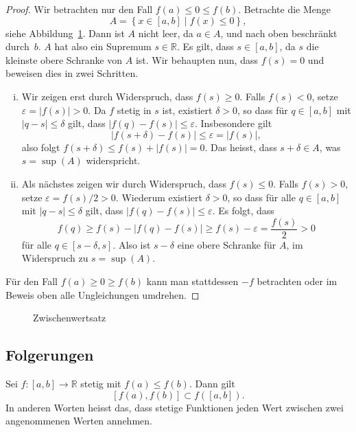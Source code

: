 \documentclass[../main.tex]{subfiles}
\begin{document}
\begin{proof}
  Wir betrachten nur den Fall $f(a) \leq 0 \leq f(b)$.
  Betrachte die Menge
  \[
    A = \left\{x \in [a, b] \mid f(x) \leq 0\right\},
  \]
  siehe Abbildung~\ref{fig:zwischen}.
  Dann ist $A$ nicht leer, da $a \in A$, und nach oben
  beschränkt durch~$b$.
  $A$ hat also ein Supremum $s \in \mathbb{R}$.
  Es gilt, dass $s \in [a,b]$, da $s$ die kleinste
  obere Schranke von $A$ ist.
  Wir behaupten nun, dass $f(s) = 0$ und beweisen
  dies in zwei Schritten.

  \begin{enumerate}[(i)]
    \item Wir zeigen erst durch Widerspruch, dass $f(s) \geq 0$.
      Falls $f(s) < 0$, setze
      $\varepsilon = |f(s)| > 0$. Da $f$ stetig in $s$ ist,
      existiert $\delta > 0$, so dass
      für $q \in [a, b]$
      mit $|q - s| \leq \delta$ gilt, dass
      $|f(q) - f(s)| \leq \varepsilon$.
      Insbesondere gilt
      \[
      |f(s + \delta) - f(s)| \leq \varepsilon = |f(s)|,
      \]
        also folgt
        $f(s + \delta) \leq f(s) + |f(s)| = 0$.
      Das heisst, dass $s + \delta \in A$, was
      $s = \sup(A)$ widerspricht.
    \item Als nächstes zeigen wir durch Widerspruch,
      dass $f(s) \leq 0$. 
      Falls $f(s) > 0$,
      setze $\varepsilon = f(s)/2 > 0$.
      Wiederum existiert $\delta > 0$, 
      so dass für alle $q \in [a, b]$ mit $|q- s| \leq \delta$ 
      gilt, dass
      $|f(q) - f(s)| \leq \varepsilon$.
      Es folgt, dass
      \[
        f(q) \geq f(s) - |f(q) - f(s)| \geq f(s) - \varepsilon = \frac{f(s)}{2}
        > 0
      \]
      für alle $q \in [s - \delta, s]$.
      Also ist $s - \delta$ eine obere Schranke für $A$,
      im Widerspruch zu $s = \sup(A)$.
  \end{enumerate}
  Für den Fall $f(a) \geq 0 \geq f(b)$ kann man
  stattdessen $-f$ betrachten
  oder im Beweis oben alle Ungleichungen umdrehen.
\end{proof}

\begin{figure}[htb]
  \centering
  
  \caption{Zwischenwertsatz}%
  \label{fig:zwischen}
\end{figure}

\subsection*{Folgerungen}
\begin{zwischenwertsatz}
  Sei $f \colon [a, b] \to \mathbb{R} $
  stetig mit $f(a) \leq f(b)$.
  Dann gilt 
  \[[f(a), f(b)] \subset f([a, b]).\]
  In anderen Worten heisst das, dass stetige
  Funktionen jeden Wert zwischen
  zwei angenommenen Werten annehmen.
\end{zwischenwertsatz}
\end{document}
